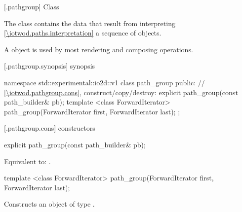  [\iotwod.pathgroup] {Class }

\pnum
{}%
The class  contains the data that result from interpreting \ref{\iotwod.paths.interpretation} a sequence of  objects. %

\pnum
A  object is used by most rendering and composing operations.

%
%
%
%
 [\iotwod.pathgroup.synopsis] { synopsis}

\begin{codeblock}
namespace std::experimental::io2d::v1 {
  class path_group {
    public:
    // \ref{\iotwod.pathgroup.cons}, construct/copy/destroy:
    explicit path_group(const path_builder& pb);
    template <class ForwardIterator>
    path_group(ForwardIterator first, ForwardIterator last);
  };
}
\end{codeblock}

 [\iotwod.pathgroup.cons] { constructors}

%
\begin{itemdecl}
explicit path_group(const path_builder& pb);
\end{itemdecl}
\begin{itemdescr}
\pnum
\effects
Equivalent to: .	
\end{itemdescr}

%
\begin{itemdecl}
template <class ForwardIterator>
path_group(ForwardIterator first, ForwardIterator last);
\end{itemdecl}
\begin{itemdescr}
\pnum
\effects
Constructs an object of type .
%
%	
\end{itemdescr}
